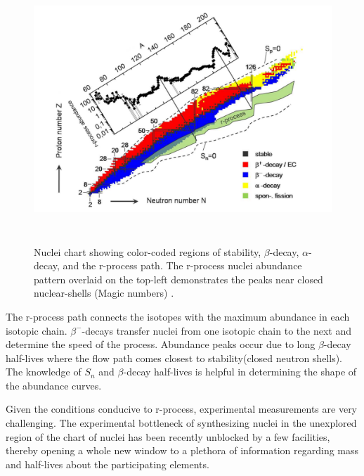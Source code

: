 \documentclass[a4paper,12pt,twoside]{report}
\begin{document}
\begin{figure}[h]
\centering
\includegraphics[width=15cm, height=10cm]{r_process_path_way.png}
\caption[Nuclei chart showing color-coded regions of stability]{Nuclei chart showing color-coded regions of stability, $\beta$-decay, $\alpha$-decay, and the r-process path. The r-process nuclei abundance pattern overlaid on the top-left demonstrates the peaks near closed nuclear-shells (Magic numbers) \cite{newmagicnumbers}.}
\label{fig:r_process}
\end{figure}
The r-process path connects the isotopes with the maximum abundance in each isotopic chain. $\beta^{-}$-decays transfer nuclei from one isotopic chain to the next and determine the speed of the process. Abundance peaks occur due to long $\beta$-decay half-lives where the flow path comes closest to stability(closed neutron shells). The knowledge of $S_{n}$ and $\beta$-decay half-lives is helpful in determining the shape of the abundance curves.

Given the conditions conducive to r-process, experimental measurements are very challenging. The experimental bottleneck of synthesizing nuclei in the unexplored region of the chart of nuclei has been recently unblocked by a few facilities, thereby opening a whole new window to a plethora of information regarding mass and half-lives about the participating elements.
\end{document}
